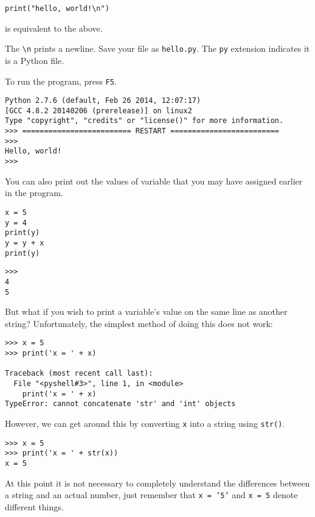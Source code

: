 \documentclass[12pt]{article}
\begin{document}
\begin{lstlisting}[style=c]
print("hello, world!\n")
\end{lstlisting}

is equivalent to the above.

The \texttt{\textbackslash n} prints a newline. Save your file as \texttt{hello.py}. The \texttt{py} extension indicates it is a Python file.

To run the program, press \texttt{F5}.

\begin{lstlisting}[style=bash]
Python 2.7.6 (default, Feb 26 2014, 12:07:17) 
[GCC 4.8.2 20140206 (prerelease)] on linux2
Type "copyright", "credits" or "license()" for more information.
>>> ========================= RESTART =========================
>>> 
Hello, world!
>>> 
\end{lstlisting}

You can also print out the values of variable that you may have assigned earlier in the program.

\begin{lstlisting}[style=c]
x = 5
y = 4
print(y)
y = y + x
print(y)
\end{lstlisting}

\begin{lstlisting}[style=bash]
>>> 
4
5
\end{lstlisting}

But what if you wish to print a variable's value on the same line as another string? Unfortunately, the simplest method of doing this does not work:

\begin{lstlisting}[style=bash]
>>> x = 5
>>> print('x = ' + x)

Traceback (most recent call last):
  File "<pyshell#3>", line 1, in <module>
    print('x = ' + x)
TypeError: cannot concatenate 'str' and 'int' objects
\end{lstlisting}

However, we can get around this by converting \texttt{x} into a string using \texttt{str()}.

\begin{lstlisting}[style=bash]
>>> x = 5
>>> print('x = ' + str(x))
x = 5
\end{lstlisting}

At this point it is not necessary to completely understand the differences between a string and an actual number, just remember that \texttt{x = '5'} and \texttt{x = 5} denote different things.
\end{document}
